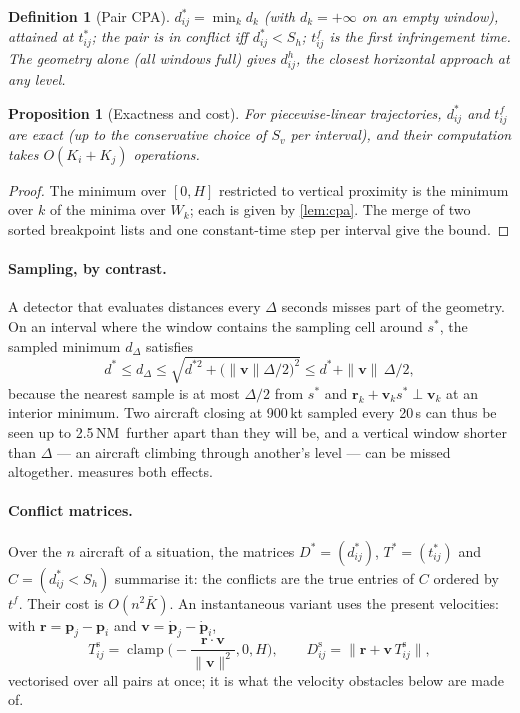 \documentclass[11pt,a4paper]{article}
\newtheorem{definition}{Definition}
\newtheorem{proposition}{Proposition}
\newcommand{\clamp}{\operatorname{clamp}}
\newcommand{\Sh}{S_h}
\newcommand{\Sv}{S_v}
\newcommand{\NM}{\ensuremath{\,\mathrm{NM}}}
\begin{document}
\begin{definition}[Pair CPA]
$d^*_{ij} = \min_k d_k$ (with $d_k=+\infty$ on an empty window), attained at $t^*_{ij}$; the pair is in conflict iff
$d^*_{ij} < \Sh$; $t^f_{ij}$ is the first infringement time. The geometry alone (all windows full) gives
$d^{h}_{ij}$, the closest horizontal approach at any level.
\end{definition}

\begin{proposition}[Exactness and cost]
For piecewise-linear trajectories, $d^*_{ij}$ and $t^f_{ij}$ are exact (up to the conservative choice of $\Sv$ per
interval), and their computation takes $O(K_i+K_j)$ operations.
\end{proposition}

\begin{proof}
The minimum over $[0,H]$ restricted to vertical proximity is the minimum over $k$ of the minima over $W_k$; each is
given by \cref{lem:cpa}. The merge of two sorted breakpoint lists and one constant-time step per interval give the
bound.
\end{proof}

\paragraph{Sampling, by contrast.} A detector that evaluates distances every $\Delta$ seconds misses part of the
geometry. On an interval where the window contains the sampling cell around $s^*$, the sampled minimum
$d_\Delta$ satisfies
\begin{equation}\label{eq:sampling}
d^* \le d_\Delta \le \sqrt{d^{*2} + \big(\|\bm v\|\Delta/2\big)^2} \le d^* + \|\bm v\|\,\Delta/2 ,
\end{equation}
because the nearest sample is at most $\Delta/2$ from $s^*$ and $\bm r_k + \bm v_k s^*\perp \bm v_k$ at an interior
minimum. Two aircraft closing at 900\,kt sampled every 20\,s can thus be seen up to 2.5\NM\ further apart than they
will be, and a vertical window shorter than $\Delta$ --- an aircraft climbing through another's level --- can be
missed altogether.  measures both effects.

\paragraph{Conflict matrices.} Over the $n$ aircraft of a situation, the matrices $D^*=(d^*_{ij})$,
$T^*=(t^*_{ij})$ and $C=(d^*_{ij}<\Sh)$ summarise it: the conflicts are the true entries of $C$ ordered by
$t^f$. Their cost is $O(n^2 \bar K)$. An instantaneous variant uses the present velocities: with
$\bm r = \bm p_j - \bm p_i$ and $\bm v = \dot{\bm p}_j - \dot{\bm p}_i$,
\begin{equation}
T^{\mathrm{s}}_{ij} = \clamp\!\Big(-\frac{\bm r\cdot\bm v}{\|\bm v\|^2},0,H\Big),\qquad
D^{\mathrm{s}}_{ij} = \big\|\bm r + \bm v\, T^{\mathrm{s}}_{ij}\big\|,
\end{equation}
vectorised over all pairs at once; it is what the velocity obstacles below are made of.
\end{document}
